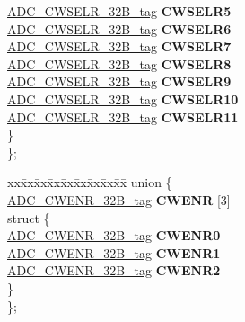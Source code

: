 \begin{DoxyCompactItemize}
\begin{tabbing}
\>\>\mbox{\hyperlink{unionADC__CWSELR__32B__tag}{ADC\_CWSELR\_32B\_tag}} {\bfseries CWSELR5}\\
\>\>\mbox{\hyperlink{unionADC__CWSELR__32B__tag}{ADC\_CWSELR\_32B\_tag}} {\bfseries CWSELR6}\\
\>\>\mbox{\hyperlink{unionADC__CWSELR__32B__tag}{ADC\_CWSELR\_32B\_tag}} {\bfseries CWSELR7}\\
\>\>\mbox{\hyperlink{unionADC__CWSELR__32B__tag}{ADC\_CWSELR\_32B\_tag}} {\bfseries CWSELR8}\\
\>\>\mbox{\hyperlink{unionADC__CWSELR__32B__tag}{ADC\_CWSELR\_32B\_tag}} {\bfseries CWSELR9}\\
\>\>\mbox{\hyperlink{unionADC__CWSELR__32B__tag}{ADC\_CWSELR\_32B\_tag}} {\bfseries CWSELR10}\\
\>\>\mbox{\hyperlink{unionADC__CWSELR__32B__tag}{ADC\_CWSELR\_32B\_tag}} {\bfseries CWSELR11}\\
\>\} \\
\}; \\

\end{tabbing}\item 
\mbox{\label{structADC__struct__tag_af284fa2074e72957300a924c38c0c780}} 
\begin{tabbing}
xx\=xx\=xx\=xx\=xx\=xx\=xx\=xx\=xx\=\kill
union \{\\
\>\mbox{\hyperlink{unionADC__CWENR__32B__tag}{ADC\_CWENR\_32B\_tag}} {\bfseries CWENR} \mbox{[}3\mbox{]}\\
\mbox{\label{unionADC__struct__tag_1_1_0D1834_a2be71b6148c34ca383af276126ecc488}} 
\>struct \{\\
\>\>\mbox{\hyperlink{unionADC__CWENR__32B__tag}{ADC\_CWENR\_32B\_tag}} {\bfseries CWENR0}\\
\>\>\mbox{\hyperlink{unionADC__CWENR__32B__tag}{ADC\_CWENR\_32B\_tag}} {\bfseries CWENR1}\\
\>\>\mbox{\hyperlink{unionADC__CWENR__32B__tag}{ADC\_CWENR\_32B\_tag}} {\bfseries CWENR2}\\
\>\} \\
\}; \\


\end{tabbing}
\end{DoxyCompactItemize}
